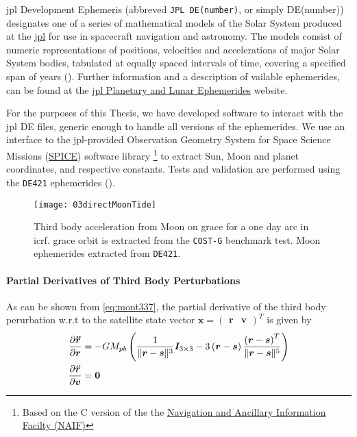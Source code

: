 \gls{jpl} Development Ephemeris (abbreved \texttt{JPL DE(number)}, or simply DE(number)) 
designates one of a series of mathematical models of the Solar System produced at the 
\href{https://www.jpl.nasa.gov/}{\gls{jpl}} for use in spacecraft navigation and astronomy. 
The models consist of numeric representations of positions, velocities and accelerations 
of major Solar System bodies, tabulated at equally spaced intervals of time, covering 
a specified span of years (\cite{wiki-jplde}). Further information and a description of 
vailable ephemerides, can be found at the 
\href{https://ssd.jpl.nasa.gov/planets/eph_export.html}{\gls{jpl} Planetary and Lunar Ephemerides} 
website.

For the purposes of this Thesis, we have developed software to interact with the 
\gls{jpl} DE files, generic enough to handle all versions of the ephemerides. 
We use an interface to the \gls{jpl}-provided Observation Geometry System
for Space Science Missions (\href{https://naif.jpl.nasa.gov/naif/}{SPICE}) 
software library \footnote{Based on the C version of the the 
\href{https://naif.jpl.nasa.gov/naif/toolkit_C.html}{Navigation and Ancillary Information Facilty (NAIF)}} 
to extract Sun, Moon and planet coordinates, and respective constants. Tests and 
validation are performed using the \texttt{DE421} ephemerides (\cite{Folkner2009}).

\begin{figure}
  \centering
  \texttt{[image: 03directMoonTide]}
  \caption{Third body acceleration from Moon on \gls{grace} for a one day arc in 
    \gls{icrf}. \gls{grace} orbit is extracted from the \texttt{COST-G} benchmark 
    test. Moon ephemerides extracted from \texttt{DE421}.}
  \label{fig:directMoonTideIcrf}
\end{figure}

\paragraph{Partial Derivatives of Third Body Perturbations}\label{par:third-body-perturbations-partials}

As can be shown from \ref{eq:mont337}, the partial derivative of the third body 
perurbation w.r.t to the satellite state vector $\bm{x}=\begin{pmatrix}\bm{r} & \bm{v} \end{pmatrix}^T$ is given by
\begin{equation}
  \begin{aligned}
    \frac{\partial \bm{\ddot{r}}}{\partial \bm{r}} &= 
      -GM_{pb} \left( \frac{1}{\lVert\bm{r}-\bm{s}\rVert^3} \bm{I}_{3\times 3} 
      -3 \left(\bm{r}-\bm{s} \right) \frac{\left(\bm{r}-\bm{s} \right)^T}{\lVert\bm{r}-\bm{s}\rVert^5}
      \right) \\
    \frac{\partial \bm{\ddot{r}}}{\partial \bm{v}} &= \bm{0}
  \end{aligned}
\end{equation}

